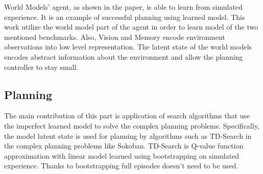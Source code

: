 World Models' agent, as shown in the paper\cite{Algo.WorldModels}, is able to learn from simulated experience. It is an example of successful planning using learned model. This work utilize the world model part of the agent in order to learn model of the two mentioned benchmarks. Also, Vision and Memory encode environment observations into low level representation. The latent state of the world models encodes abstract information about the environment and allow the planning controller to stay small.

\subsection{Planning}

The main contribution of this part is application of search algorithms that use the imperfect learned model to solve the complex planning problems. Specifically, the model latent state is used for planning by algorithms such as TD-Search in the complex planning problems like Sokoban. TD-Search is Q-value function approximation with linear model learned using bootstrapping on simulated experience. Thanks to bootstrapping full episodes doesn’t need to be used.
